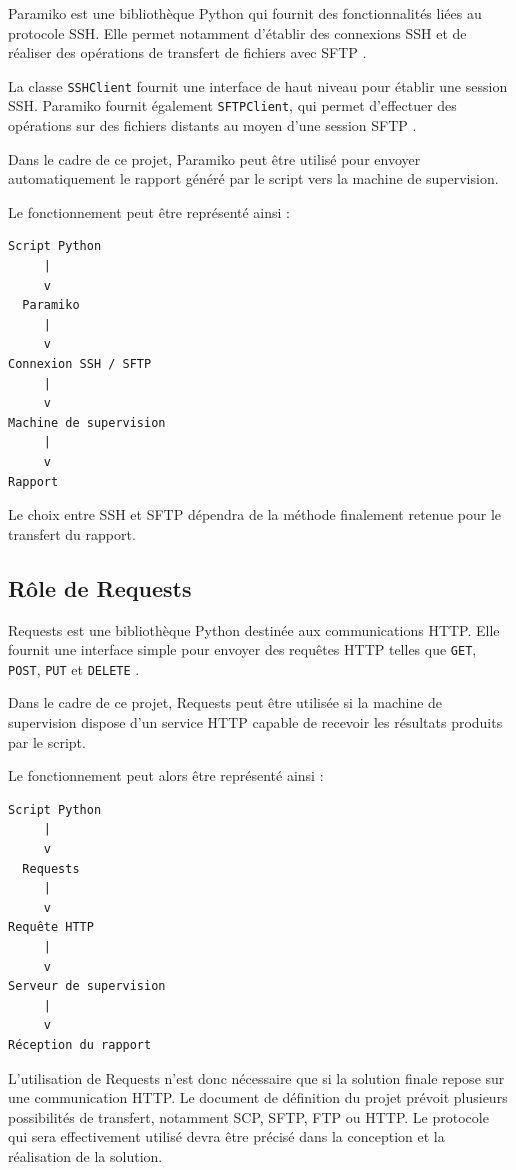 \documentclass[12pt, a4paper, oneside]{report}
\begin{document}
Paramiko est une bibliothèque Python qui fournit des fonctionnalités liées au protocole SSH. Elle permet notamment d'établir des connexions SSH et de réaliser des opérations de transfert de fichiers avec SFTP \cite{paramiko_documentation}.

La classe \texttt{SSHClient} fournit une interface de haut niveau pour établir une session SSH. Paramiko fournit également \texttt{SFTPClient}, qui permet d'effectuer des opérations sur des fichiers distants au moyen d'une session SFTP \cite{paramiko_documentation}.

Dans le cadre de ce projet, Paramiko peut être utilisé pour envoyer automatiquement le rapport généré par le script vers la machine de supervision.

Le fonctionnement peut être représenté ainsi :

\begin{verbatim}
Script Python
     |
     v
  Paramiko
     |
     v
Connexion SSH / SFTP
     |
     v
Machine de supervision
     |
     v
Rapport
\end{verbatim}

Le choix entre SSH et SFTP dépendra de la méthode finalement retenue pour le transfert du rapport.

\subsection*{Rôle de Requests}

Requests est une bibliothèque Python destinée aux communications HTTP. Elle fournit une interface simple pour envoyer des requêtes HTTP telles que \texttt{GET}, \texttt{POST}, \texttt{PUT} et \texttt{DELETE} \cite{requests_documentation}.

Dans le cadre de ce projet, Requests peut être utilisée si la machine de supervision dispose d'un service HTTP capable de recevoir les résultats produits par le script.

Le fonctionnement peut alors être représenté ainsi :

\begin{verbatim}
Script Python
     |
     v
  Requests
     |
     v
Requête HTTP
     |
     v
Serveur de supervision
     |
     v
Réception du rapport
\end{verbatim}

L'utilisation de Requests n'est donc nécessaire que si la solution finale repose sur une communication HTTP. Le document de définition du projet prévoit plusieurs possibilités de transfert, notamment SCP, SFTP, FTP ou HTTP. Le protocole qui sera effectivement utilisé devra être précisé dans la conception et la réalisation de la solution.
\end{document}
